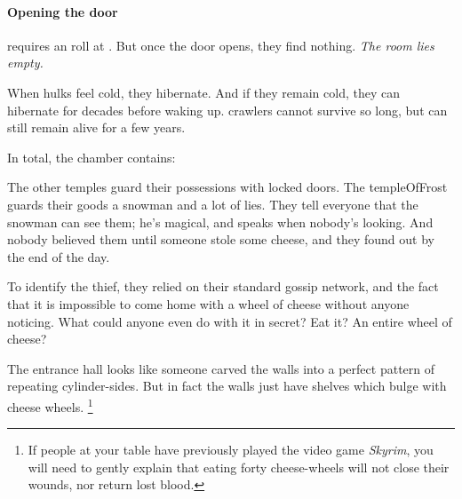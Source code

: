 \begin{multicols}{2}
\paragraph{Opening the door}
requires an  roll at \tn[12].
But once the door opens, they find nothing.
\emph{The room lies empty.}


When \glspl{hulk} feel cold, they hibernate.
And if they remain cold, they can hibernate for decades before waking up.
\Glspl{crawler} cannot survive so long, but can still remain alive for a few years.

In total, the chamber contains:

\chitincrawler

\chitincrawler



\basilisk

\dragon

\showStdSpells



\begin{exampletext}
  The other \glspl{temple} guard their possessions with locked doors.
  The \gls{templeOfFrost} guards their goods a snowman and a lot of lies.
  They tell everyone that the snowman can see them; he's magical, and speaks when nobody's looking.
  And nobody believed them until someone stole some cheese, and they found out by the end of the day.

  To identify the thief, they relied on their standard gossip network, and the fact that it is impossible to come home with a wheel of cheese without anyone noticing.
  What could anyone even do with it in secret?
  Eat it?
  An entire wheel of cheese?
\end{exampletext}

The entrance hall looks like someone carved the walls into a perfect pattern of repeating cylinder-sides.
But in fact the walls just have shelves which bulge with cheese wheels.%
\footnote{If people at your table have previously played the video game \textit{Skyrim}, you will need to gently explain that eating forty cheese-wheels will not close their wounds, nor return lost blood.}



\end{multicols}
